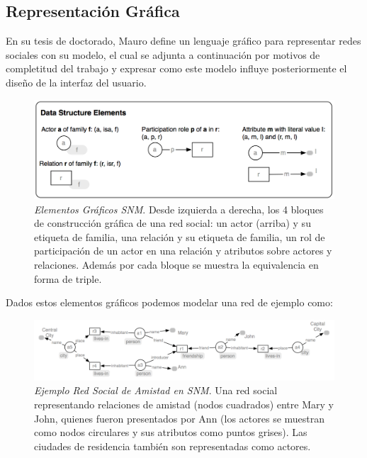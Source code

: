 
\subsection{Representación Gráfica} %
\label{sub:representacian_grafica}

En su tesis de doctorado\cite{tesismauro}, Mauro define un lenguaje gráfico para representar redes sociales con su modelo, el cual se adjunta a continuación por motivos de completitud del trabajo y expresar como este modelo influye posteriormente el diseño de la interfaz del usuario.\\

\begin{figure}[H]
  \includegraphics[width=1.0\textwidth]{images/elementos_modelo_mauro.png}
  \caption[Elementos Gráficos SNM]{\emph{Elementos Gráficos SNM}. Desde izquierda a derecha, los 4 bloques de construcción gráfica de una red social: un actor (arriba) y su etiqueta de familia, una relación y su etiqueta de familia, un rol de participación de un actor en una relación y atributos sobre actores y relaciones. Además por cada bloque se muestra la equivalencia en forma de triple.}
  \label{elementos_graficos_snm}
\end{figure}

Dados estos elementos gráficos podemos modelar una red de ejemplo como:

\begin{figure}[H]
  \includegraphics[width=1.0\textwidth]{images/ejemplo_red_social_mauro.png}
  \caption[Ejemplo Red Social de Amistad en SNM]{\emph{Ejemplo Red Social de Amistad en SNM}. Una red social representando relaciones de amistad (nodos cuadrados) entre Mary y John, quienes fueron presentados por Ann (los actores se muestran como nodos circulares y sus atributos como puntos grises). Las ciudades de residencia también son representadas como actores.}
  \label{ejemplo_red_snm}
\end{figure}


